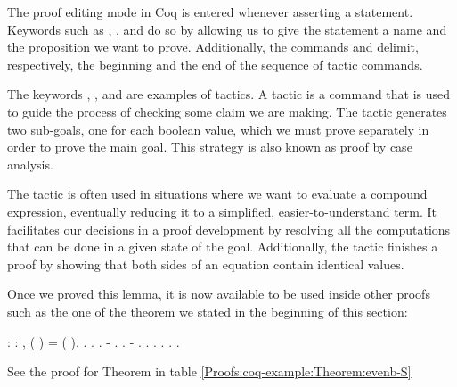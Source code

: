 The proof editing mode in Coq is entered whenever asserting a statement. Keywords such as , , and  do so by allowing us to give the statement a name and the proposition we want to prove. Additionally, the commands  and  delimit, respectively, the beginning and the end of the sequence of tactic commands.

The keywords , , and  are examples of tactics. A tactic is a command that is used to guide the process of checking some claim we are making. The tactic  generates two sub-goals, one for each boolean value, which we must prove separately in order to prove the main goal. This strategy is also known as proof by case analysis.

The tactic  is often used in situations where we want to evaluate a compound expression, eventually reducing it to a simplified, easier-to-understand term. It facilitates our decisions in a proof development by resolving all the computations that can be done in a given state of the goal. Additionally, the tactic  finishes a proof by showing that both sides of an equation contain identical values.

Once we proved this lemma, it is now available to be used inside other proofs such as the one of the theorem we stated in the beginning of this section:

\begin{coqdoccode}
	\coqdocnoindent
	  : \coqdockw{\ensuremath{\forall}}  : ,\coqdoceol
	\coqdocindent{1.00em}
	 ( ) =  ( ).\coqdoceol
	\coqdocnoindent
	.\coqdoceol
	\coqdocindent{1.00em}
	.  .\coqdoceol
	\coqdocindent{1.00em}
	- . .\coqdoceol
	\coqdocindent{1.00em}
	- .   .  .\coqdoceol
	\coqdocindent{2.00em}
	 . .\coqdoceol
	\coqdocnoindent
	.\coqdoceol
\end{coqdoccode}

\noindent See the proof for Theorem  in table \ref{Proofs:coq-example:Theorem:evenb-S}

